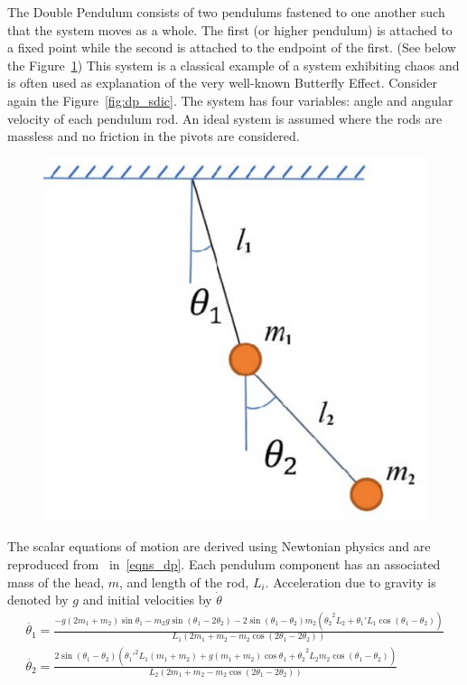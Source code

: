 The Double Pendulum consists of two pendulums fastened to one another such that the system moves as a whole. The first (or higher pendulum) is attached to a fixed point while the second is attached to the endpoint of the first. (See below the Figure~\ref{fig:dp_setup})
This system is a classical example of a system exhibiting chaos and is often used as explanation of the very well-known Butterfly Effect.  Consider again the Figure~\ref{fig:dp_sdic}.
The system has four variables: angle and angular velocity of each pendulum rod. An ideal system is assumed where the rods are massless and no friction in the pivots are considered.
\begin{figure}[ht]
  \includegraphics[scale=0.35]{Graphs/_dp_setup.eps}
  \centering
\label{fig:dp_setup}
\end{figure}

The scalar equations of motion are derived using Newtonian physics and are reproduced from~\cite{DPFormulas} in~\ref{eqns_dp}. Each pendulum component has an associated mass of the head, $m$, and length of the rod, $L_i$. Acceleration due to gravity is denoted by $g$ and initial velocities by $\dot{\theta}$
\begin{eqnarray}\label{eqns_dp}
  \ddot{\theta_{1}}  = \frac{-g(2m_1+m_2)\sin{\theta_1} - m_2g\sin(\theta_1-2\theta_2) - 2\sin(\theta_1-\theta_2)m_2({\dot{\theta_{2}}}^{2}L_2 + {\theta_{1}'}L_1\cos(\theta_1-\theta_2))} {L_1(2m_1 + m_2 -m_2\cos(2\theta_1 - 2\theta_2))}
  \\
  \ddot{\theta_{2}} = \frac{2\sin(\theta_1-\theta_2)(\theta_{1}'^{2}L_1(m_1+m_2) + g(m_1+m_2)\cos\theta_1 + \dot{\theta_{2}}^{2}L_2m_2\cos(\theta_1-\theta_2))}{L_2(2m_1 + m_2 -m_2\cos(2\theta_1 - 2\theta_2))}
\end{eqnarray}

